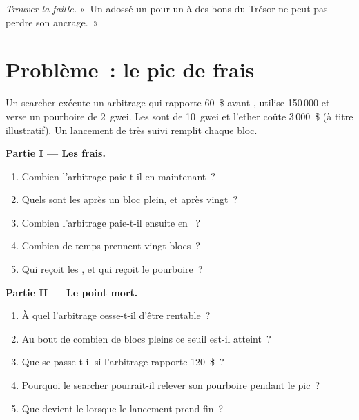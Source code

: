 \begin{exercise}[$\star\star\star$]\label{exo:m3:blockchains-for-traders:8}
\emph{Trouver la faille.} «~Un  adossé un pour un à des bons du Trésor ne peut pas perdre son ancrage.~»
\end{exercise}

\section{Problème~: le pic de frais}

\begin{problem}\label{pb:m3:blockchains-for-traders:1}
Un searcher exécute un arbitrage qui rapporte 60~\$ avant , utilise 150\,000  et verse un pourboire de 2~gwei. Les  sont de 10~gwei et
l'ether coûte 3\,000~\$ (à titre illustratif). Un lancement de  très suivi remplit chaque bloc.

\medskip\noindent\textbf{Partie I --- Les frais.}
\begin{enumerate}
\item Combien l'arbitrage paie-t-il en  maintenant~?
\item Quels sont les  après un bloc plein, et après vingt~?
\item Combien l'arbitrage paie-t-il ensuite en ~?
\item Combien de temps prennent vingt blocs~?
\item Qui reçoit les , et qui reçoit le pourboire~?
\end{enumerate}

\medskip\noindent\textbf{Partie II --- Le point mort.}
\begin{enumerate}[resume]
\item À quel  l'arbitrage cesse-t-il d'être rentable~?
\item Au bout de combien de blocs pleins ce seuil est-il atteint~?
\item Que se passe-t-il si l'arbitrage rapporte 120~\$~?
\item Pourquoi le searcher pourrait-il relever son pourboire pendant le pic~?
\item Que devient le  lorsque le lancement prend fin~?
\end{enumerate}


\end{problem}
